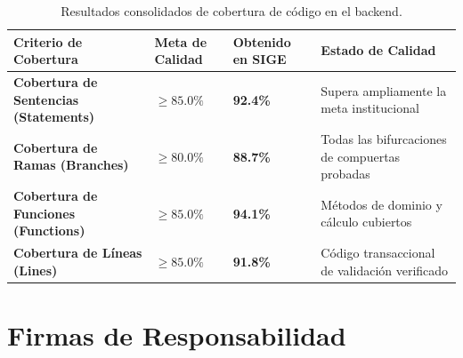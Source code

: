 \documentclass[12pt,a4paper]{article}
\begin{document}
\begin{table}[H]
\centering
\small
\renewcommand{\arraystretch}{1.2}
\begin{tabularx}{\textwidth}{|>{\hsize=0.9\hsize\raggedright\arraybackslash\bfseries\footnotesize}X|>{\hsize=0.5\hsize\centering\arraybackslash\footnotesize}X|>{\hsize=0.5\hsize\centering\arraybackslash\footnotesize}X|>{\hsize=2.1\hsize\raggedright\arraybackslash\footnotesize}X|}
\hline
\rowcolor{tableheader}
\textbf{Criterio de Cobertura} & \textbf{Meta de Calidad} & \textbf{Obtenido en SIGE} & \textbf{Estado de Calidad} \\
\hline
Cobertura de Sentencias (Statements) & $\ge 85.0\%$ & \textbf{92.4\%} & Supera ampliamente la meta institucional \\
\hline
Cobertura de Ramas (Branches) & $\ge 80.0\%$ & \textbf{88.7\%} & Todas las bifurcaciones de compuertas probadas \\
\hline
Cobertura de Funciones (Functions) & $\ge 85.0\%$ & \textbf{94.1\%} & Métodos de dominio y cálculo cubiertos \\
\hline
Cobertura de Líneas (Lines) & $\ge 85.0\%$ & \textbf{91.8\%} & Código transaccional de validación verificado \\
\hline
\end{tabularx}
\caption{Resultados consolidados de cobertura de código en el backend.}
\end{table}

\section{Firmas de Responsabilidad}
\end{document}
